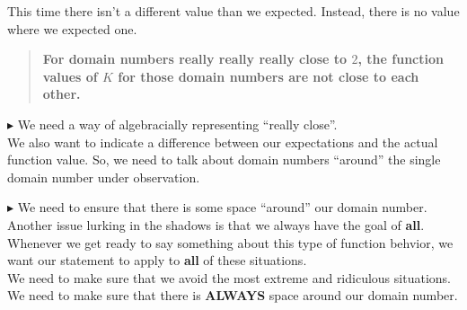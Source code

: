 \documentclass{ximera}
\begin{document}
This time there isn't a different value than we expected.  Instead, there is no value where we expected one.


\begin{quote}
 \textbf{\textcolor{blue!55!black}{For domain numbers really really really close to $2$, the function values of $K$ for those domain numbers are not close to each other.}} 
\end{quote}







\textbf{\textcolor{red!90!darkgray}{$\blacktriangleright$}} We need a way of algebracially representing ``really close''.  \\


We also want to indicate a difference between our expectations and the actual function value. So, we need to talk about domain numbers ``around'' the single domain number under observation. 


\textbf{\textcolor{red!90!darkgray}{$\blacktriangleright$}} We need to ensure that there is some space ``around'' our domain number. \\





Another issue lurking in the shadows is that we always have the goal of \textbf{\textcolor{red!80!black}{all}}. Whenever we get ready to say something about this type of function behvior, we want our statement to apply to \textbf{\textcolor{red!80!black}{all}} of these situations. \\

We need to make sure that we avoid the most extreme and ridiculous situations.  We need to make sure that there is \textbf{\textcolor{red!80!black}{ALWAYS}} space around our domain number.
\end{document}
